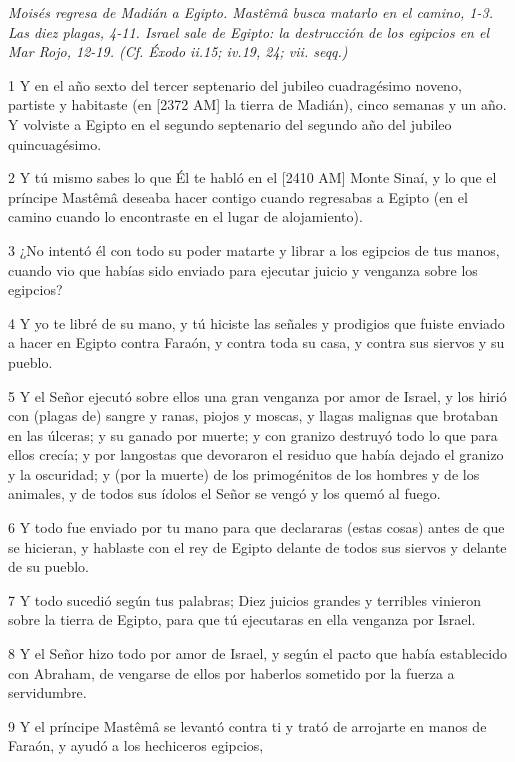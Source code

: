 \par \textit{Moisés regresa de Madián a Egipto. Mastêmâ busca matarlo en el camino, 1-3. Las diez plagas, 4-11. Israel sale de Egipto: la destrucción de los egipcios en el Mar Rojo, 12-19. (Cf. Éxodo ii.15; iv.19, 24; vii. seqq.)}

\par 1 Y en el año sexto del tercer septenario del jubileo cuadragésimo noveno, partiste y habitaste (en [2372 AM] la tierra de Madián), cinco semanas y un año. Y volviste a Egipto en el segundo septenario del segundo año del jubileo quincuagésimo.
\par 2 Y tú mismo sabes lo que Él te habló en el [2410 AM] Monte Sinaí, y lo que el príncipe Mastêmâ deseaba hacer contigo cuando regresabas a Egipto (en el camino cuando lo encontraste en el lugar de alojamiento).
\par 3 ¿No intentó él con todo su poder matarte y librar a los egipcios de tus manos, cuando vio que habías sido enviado para ejecutar juicio y venganza sobre los egipcios?
\par 4 Y yo te libré de su mano, y tú hiciste las señales y prodigios que fuiste enviado a hacer en Egipto contra Faraón, y contra toda su casa, y contra sus siervos y su pueblo.
\par 5 Y el Señor ejecutó sobre ellos una gran venganza por amor de Israel, y los hirió con (plagas de) sangre y ranas, piojos y moscas, y llagas malignas que brotaban en las úlceras; y su ganado por muerte; y con granizo destruyó todo lo que para ellos crecía; y por langostas que devoraron el residuo que había dejado el granizo y la oscuridad; y (por la muerte) de los primogénitos de los hombres y de los animales, y de todos sus ídolos el Señor se vengó y los quemó al fuego.
\par 6 Y todo fue enviado por tu mano para que declararas (estas cosas) antes de que se hicieran, y hablaste con el rey de Egipto delante de todos sus siervos y delante de su pueblo.
\par 7 Y todo sucedió según tus palabras; Diez juicios grandes y terribles vinieron sobre la tierra de Egipto, para que tú ejecutaras en ella venganza por Israel.
\par 8 Y el Señor hizo todo por amor de Israel, y según el pacto que había establecido con Abraham, de vengarse de ellos por haberlos sometido por la fuerza a servidumbre.
\par 9 Y el príncipe Mastêmâ se levantó contra ti y trató de arrojarte en manos de Faraón, y ayudó a los hechiceros egipcios,
